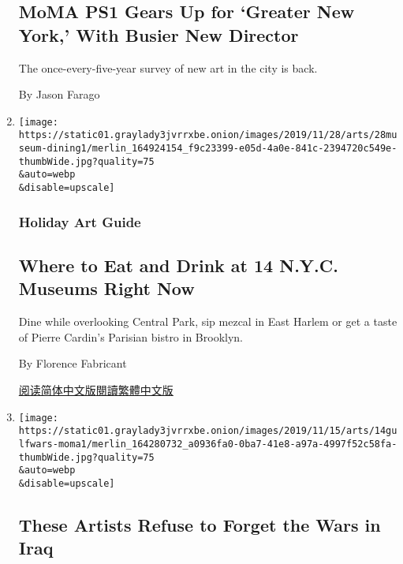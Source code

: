 \begin{enumerate}
  \hypertarget{moma-ps1-gears-up-for-greater-new-york-with-busier-new-director}{%
  \subsection{MoMA PS1 Gears Up for `Greater New York,' With Busier New
  Director}\label{moma-ps1-gears-up-for-greater-new-york-with-busier-new-director}}

  The once-every-five-year survey of new art in the city is back.

  By Jason Farago
\item
  \href{/2019/11/28/arts/design/eat-drink-nyc-museums.html}{}

  \texttt{[image: https://static01.graylady3jvrrxbe.onion/images/2019/11/28/arts/28museum-dining1/merlin\_164924154\_f9c23399-e05d-4a0e-841c-2394720c549e-thumbWide.jpg?quality=75\\\&auto=webp\\\&disable=upscale]}

  \hypertarget{holiday-art-guide}{%
  \subsubsection{Holiday Art Guide}\label{holiday-art-guide}}

  \hypertarget{where-to-eat-and-drink-at-14-nyc-museums-right-now}{%
  \subsection{Where to Eat and Drink at 14 N.Y.C. Museums Right
  Now}\label{where-to-eat-and-drink-at-14-nyc-museums-right-now}}

  Dine while overlooking Central Park, sip mezcal in East Harlem or get
  a taste of Pierre Cardin's Parisian bistro in Brooklyn.

  By Florence Fabricant

  \href{https://cn.nytimes3xbfgragh.onion/style/20191226/eat-drink-nyc-museums/}{阅读简体中文版}\href{https://cn.nytimes3xbfgragh.onion/style/20191226/eat-drink-nyc-museums/zh-hant/}{閱讀繁體中文版}
\item
  \href{/2019/11/14/arts/design/iraq-wars-art-momaps1-review.html}{}

  \texttt{[image: https://static01.graylady3jvrrxbe.onion/images/2019/11/15/arts/14gulfwars-moma1/merlin\_164280732\_a0936fa0-0ba7-41e8-a97a-4997f52c58fa-thumbWide.jpg?quality=75\\\&auto=webp\\\&disable=upscale]}

  \hypertarget{these-artists-refuse-to-forget-the-wars-in-iraq}{%
  \subsection{These Artists Refuse to Forget the Wars in
  Iraq}\label{these-artists-refuse-to-forget-the-wars-in-iraq}}


\end{enumerate}
